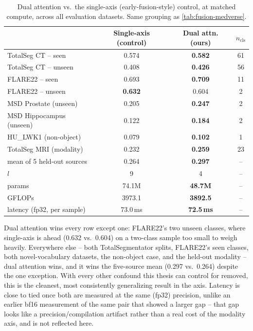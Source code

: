 \begin{table}[t]
  \centering
  \small
  \caption{Dual attention vs.\ the single-axis (early-fusion-style) control, at matched
  compute, across all evaluation datasets. Same grouping as \autoref{tab:fusion-medverse}.}
  \label{tab:fusion-axis}
  \begin{tabular}{lccc}
    \toprule
     & Single-axis (control) & Dual attn. (ours) & $n_\text{cls}$ \\
    \midrule
    TotalSeg CT -- seen      & 0.574 & \textbf{0.582} & 61 \\
    TotalSeg CT -- unseen    & 0.408 & \textbf{0.426} & 56 \\
    FLARE22 -- seen          & 0.693 & \textbf{0.709} & 11 \\
    FLARE22 -- unseen        & \textbf{0.632} & 0.604 & 2  \\
    \midrule
    MSD Prostate (unseen)    & 0.205 & \textbf{0.247} & 2 \\
    MSD Hippocampus (unseen) & 0.122 & \textbf{0.184} & 2 \\
    \midrule
    HU\_LWK1 (non-object)    & 0.079 & \textbf{0.102} & 1 \\
    \midrule
    TotalSeg MRI (modality)  & 0.232 & \textbf{0.259} & 23 \\
    \midrule
    mean of 5 held-out sources & 0.264 & \textbf{0.297} & -- \\
    \midrule
    $l$       & 9      & 4       & -- \\
    params    & 74.1M  & \textbf{48.7M}  & -- \\
    GFLOPs    & 3973.1 & \textbf{3892.5} & -- \\
    latency (fp32, per sample) & 73.0\,ms & \textbf{72.5\,ms} & -- \\
    \bottomrule
  \end{tabular}
\end{table}

Dual attention wins every row except one: FLARE22's two unseen classes, where
single-axis is ahead (0.632 vs.\ 0.604) on a two-class sample too small to weigh heavily.
Everywhere else -- both TotalSegmentator splits, FLARE22's seen classes, both
novel-vocabulary datasets, the non-object case, and the held-out modality -- dual attention wins,
and it wins the five-source mean (0.297 vs.\ 0.264) despite the one exception. With every
other confound this thesis can control for removed, this is the cleanest, most consistently
generalizing result in the axis. Latency is close to tied once both are measured at the same
(fp32) precision, unlike an earlier bf16 measurement of the same pair that showed a larger
gap -- that gap looks like a precision/compilation artifact rather than a real cost of the
modality axis, and is not reflected here.

